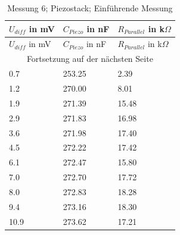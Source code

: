 \documentclass[11pt]{scrreprt} %
\begin{document}
\setlongtables
\begin{longtable}{| l |l| l |}
\caption{Messung 6; Piezostack; Einführende Messung}\\
\hline
$U_{diff}$ in mV&$C_{Piezo}$ in nF&$R_{Parallel}$ in k$\Omega$\\
\hline
\endfirsthead
\hline
$U_{diff}$ in mV&$C_{Piezo}$ in nF&$R_{Parallel}$ in k$\Omega$\\
\hline
\endhead
\hline
\multicolumn{3}{|c|}{Fortsetzung auf der nächsten Seite}\\
\hline
\endfoot
\hline \hline
\endlastfoot
\hline
\label{tab:2.6}%
0.7&253.25&2.39\\
1.2&270.00&8.01\\
1.9&271.39&15.48\\
2.9&271.83&16.98\\
3.6&271.98&17.40\\
4.5&272.22&17.42\\
6.1&272.47&15.80\\
7.0&272.70&17.72\\
8.0&272.83&18.28\\
9.4&273.16&18.30\\
10.9&273.62&17.21\\
\end{longtable}
\end{document}
